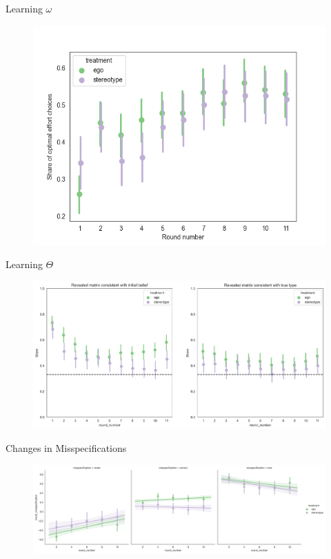 \documentclass[aspectratio=169]{beamer}
\begin{document}
\begin{frame}{Learning $\omega$}
    \begin{figure}
        \centering
        \includegraphics[scale=.5]{effort_learning.png}
    \end{figure}

\end{frame}

\begin{frame}{Learning $\Theta$}
    \begin{figure}
        \centering
        \includegraphics[scale=.33]{last_button_consistency.png}
    \end{figure}
    
\end{frame}

\begin{frame}{Changes in Misspecifications}
    \label{misspecificationsroundstypes}
    \begin{figure}
        \centering
        \includegraphics[scale=.3]{misspecification_evolution_tratment.png}
    \end{figure}
\end{frame}
\end{document}
